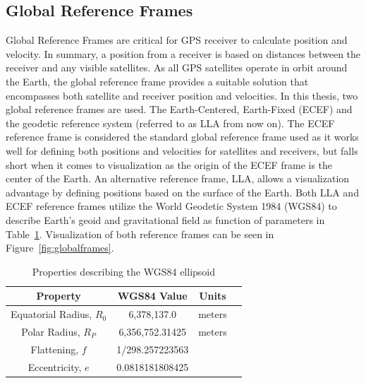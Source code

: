 \subsection{Global Reference Frames}
Global Reference Frames are critical for GPS receiver to calculate position and velocity. In summary, a position from a receiver is based on distances between the receiver and any visible satellites. As all GPS satellites operate in orbit around the Earth, the global reference frame provides a suitable solution that encompasses both satellite and receiver position and velocities. In this thesis, two global reference frames are used. The Earth-Centered, Earth-Fixed (ECEF) and the geodetic reference system (referred to as LLA from now on). The ECEF reference frame is considered the standard global reference frame used as it works well for defining both positions and velocities for satellites and receivers, but falls short when it comes to visualization as the origin of the ECEF frame is the center of the Earth. An alternative reference frame, LLA, allows a visualization advantage by defining positions based on the surface of the Earth. Both LLA and ECEF reference frames utilize the World Geodetic System 1984 (WGS84) to describe Earth's geoid and gravitational field as function of parameters in Table~\ref{tbl:wgs84}. Visualization of both reference frames can be seen in Figure~\ref{fig:globalframes}.

\begin{table}[!ht]\label{tbl:wgs84}
    \caption{Properties describing the WGS84 ellipsoid}
    \centering
    \begin{tabular}{cccc}
        \toprule
        \textbf{Property}          & \textbf{WGS84 Value} & \textbf{Units} \\
        \midrule
        Equatorial Radius, \(R_0\) & 6,378,137.0          & meters         \\
        Polar Radius, \(R_P\)      & 6,356,752.31425      & meters         \\
        Flattening, \(f\)          & 1/298.257223563      &                \\
        Eccentricity, \(e\)        & 0.0818181808425      &                \\
        \bottomrule
    \end{tabular}
\end{table}

